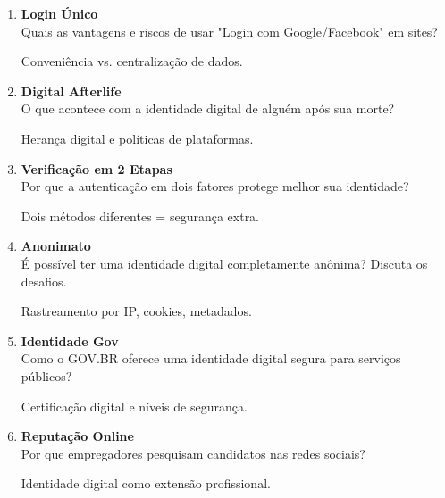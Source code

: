 \documentclass[11pt]{article}
\begin{document}
\begin{multicols}{2}
\begin{enumerate}
\item \textbf{Login Único}\\
Quais as vantagens e riscos de usar "Login com Google/Facebook" em sites?
\begin{tcolorbox}[colback=explanationbg,colframe=titleblue,title=Dica:]
Conveniência vs. centralização de dados.
\end{tcolorbox}

\item \textbf{Digital Afterlife}\\
O que acontece com a identidade digital de alguém após sua morte?
\begin{tcolorbox}[colback=explanationbg,colframe=titleblue,title=Dica:]
Herança digital e políticas de plataformas.
\end{tcolorbox}

\item \textbf{Verificação em 2 Etapas}\\
Por que a autenticação em dois fatores protege melhor sua identidade?
\begin{tcolorbox}[colback=explanationbg,colframe=titleblue,title=Dica:]
Dois métodos diferentes = segurança extra.
\end{tcolorbox}

\item \textbf{Anonimato}\\
É possível ter uma identidade digital completamente anônima? Discuta os desafios.
\begin{tcolorbox}[colback=explanationbg,colframe=titleblue,title=Dica:]
Rastreamento por IP, cookies, metadados.
\end{tcolorbox}

\item \textbf{Identidade Gov}\\
Como o GOV.BR oferece uma identidade digital segura para serviços públicos?
\begin{tcolorbox}[colback=explanationbg,colframe=titleblue,title=Dica:]
Certificação digital e níveis de segurança.
\end{tcolorbox}

\item \textbf{Reputação Online}\\
Por que empregadores pesquisam candidatos nas redes sociais?
\begin{tcolorbox}[colback=explanationbg,colframe=titleblue,title=Dica:]
Identidade digital como extensão profissional.
\end{tcolorbox}


\end{enumerate}
\end{multicols}
\end{document}
